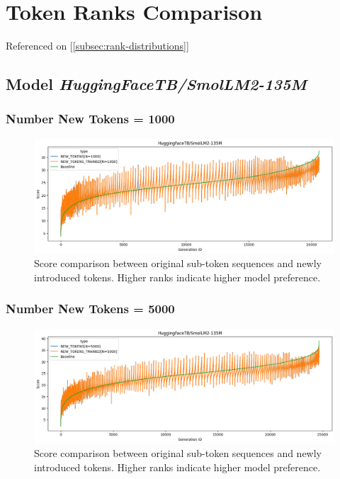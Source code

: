 \section{Token Ranks Comparison}
\label{annex:results-rank-comparison}

Referenced on [\ref{subsec:rank-distributions}]\\


\subsection{Model \textit{HuggingFaceTB/SmolLM2-135M}}

\subsubsection{Number New Tokens = 1000}
\begin{figure}[H]
    \centering
    \includegraphics[width=\textwidth]{Figures/Appendix/token-rank-comparison_1000_smol135M.png}
    \caption[Score comparison for \textit{SmolLM2-135M} w/ 1000 new tokens]{Score comparison between original sub-token sequences and newly introduced tokens. Higher ranks indicate higher model preference.}
    \label{annex:fig:new_token_rank:1000_smol135M}
\end{figure}
\FloatBarrier
\subsubsection{Number New Tokens = 5000}
\begin{figure}[H]
    \centering
    \includegraphics[width=\textwidth]{Figures/Appendix/token-rank-comparison_5000_smol135M.png}
    \caption[Score comparison for \textit{SmolLM2-135M} w/ 5000 new tokens]{Score comparison between original sub-token sequences and newly introduced tokens. Higher ranks indicate higher model preference.}
    \label{annex:fig:new_token_rank:5000_smol135M}
\end{figure}
\FloatBarrier
